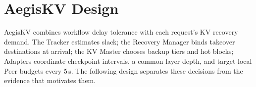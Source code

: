 \section{AegisKV Design}
\label{sec:design}

AegisKV combines workflow delay tolerance with each request's KV
recovery demand. The Tracker estimates slack; the Recovery Manager binds
takeover destinations at arrival; the KV Master chooses backup tiers
and hot blocks; Adapters coordinate checkpoint intervals, a common layer
depth, and target-local Peer budgets every 5\,s. The following design
separates these decisions from the evidence that motivates them.








